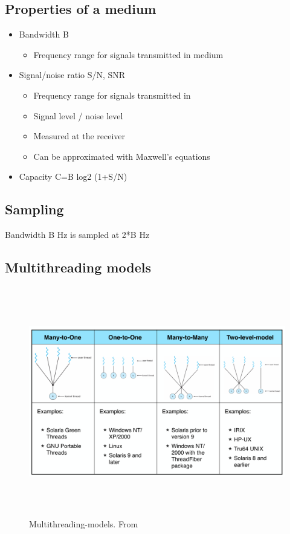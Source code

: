 \subsection{Properties of a medium}
\begin{itemize}
\item Bandwidth B
  \begin{itemize}
    \item Frequency range for signals transmitted in medium
  \end{itemize}
\item Signal/noise ratio S/N, SNR
  \begin{itemize}
    \item Frequency range for signals transmitted in
    \item Signal level / noise level
    \item Measured at the receiver
    \item Can be approximated with Maxwell’s equations
  \end{itemize}
\item Capacity C=B log2 (1+S/N)
\end{itemize}

\subsection{Sampling}
Bandwidth B Hz is sampled at 2*B Hz

\subsection{Multithreading models}
\begin{figure}[h]
    \vspace{10mm}
    \centering
    \includegraphics[width=16cm, height=10cm]{image/Multithreading-models.png}
    \caption{Multithreading-models. From \cite{}}
\end{figure}


